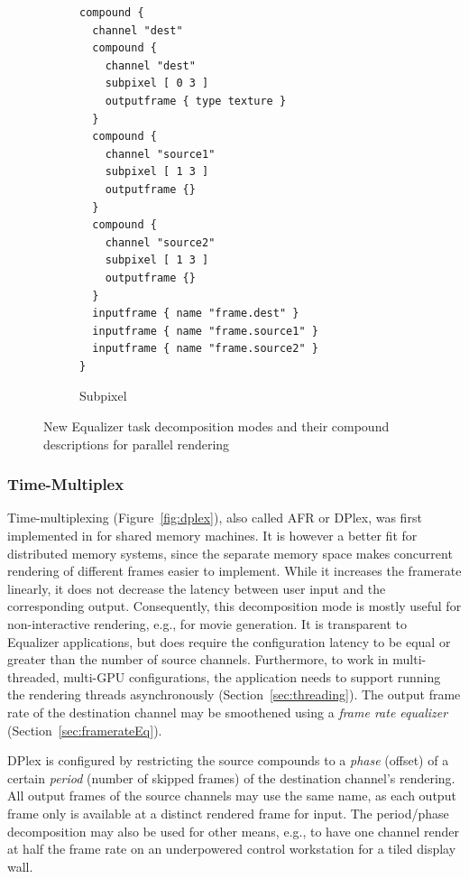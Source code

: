 \documentclass[10pt,journal,compsoc]{IEEEtran}
\newcommand{\sref}[1]{Section~\ref{#1}}
\newcommand{\fig}[1]{Figure~\ref{#1}}
\providecommand{\DIFaddtex}[1]{{\protect\color{blue} \sf #1}} %
\providecommand{\DIFaddbegin}{} %
\providecommand{\DIFaddend}{} %
\providecommand{\DIFadd}[1]{\texorpdfstring{\DIFaddtex{#1}}{#1}} %
\newcommand{\DIFaddincludegraphics}[2][]{{\color{blue}\fbox{\DIFOincludegraphics[#1]{#2}}}} %
\DeclareRobustCommand{\DIFaddbegin}{\DIFOaddbegin \let\includegraphics\DIFaddincludegraphics} %
\DeclareRobustCommand{\DIFaddend}{\DIFOaddend \let\includegraphics\DIFOincludegraphics} %
\begin{document}
\begin{figure}[ht]
\begin{subfigure}[t]{0.24\textwidth}
{\begin{lstlisting}
compound {
  channel "dest"
  compound {
    channel "dest"
    subpixel [ 0 3 ]
    outputframe { type texture }
  }
  compound {
    channel "source1"
    subpixel [ 1 3 ]
    outputframe {}
  }
  compound {
    channel "source2"
    subpixel [ 1 3 ]
    outputframe {}
  }
  inputframe { name "frame.dest" }
  inputframe { name "frame.source1" }
  inputframe { name "frame.source2" }
}
    \end{lstlisting}\vspace{21ex}}
    \caption{\label{fig:subpixel}Subpixel}
  \end{subfigure}
  \caption{New \textsf{Equalizer} task decomposition modes and their compound
descriptions for parallel rendering}
  \label{fig:compounds}
\end{figure}


\subsubsection{Time-Multiplex}

Time-multiplexing (\fig{fig:dplex}), also called AFR or DPlex, was first
implemented in \cite{BRE:05} for shared memory machines. It is however a better
fit for distributed memory systems, since the separate memory space makes
concurrent rendering of different frames easier to implement. While it
increases the framerate linearly, it does not decrease the latency between user
input and the corresponding output. Consequently, this decomposition mode is
mostly useful for non-interactive \DIFaddbegin \DIFadd{rendering, e.g., for }\DIFaddend movie generation. It is
transparent to \textsf{Equalizer} applications, but does require the
configuration latency to be equal or greater than the number of source
channels. Furthermore, to work in multi-threaded, multi-GPU configurations, the
application needs to support running the rendering threads asynchronously
(\sref{sec:threading}). The output frame rate of the destination channel may be
smoothened using a {\em frame rate equalizer} (\sref{sec:framerateEq}).

\DIFaddbegin \DIFadd{DPlex is configured by restricting the source compounds to a \textit{phase}
(offset) of a certain \textit{period} (number of skipped frames) of the
destination channel's rendering. All output frames of the source channels may
use the same name, as each output frame only is available at a distinct
rendered frame for input. The period/phase decomposition may also be used for
other means, e.g., to have one channel render at half the frame rate on an
underpowered control workstation for a tiled display wall.
}
\end{document}
